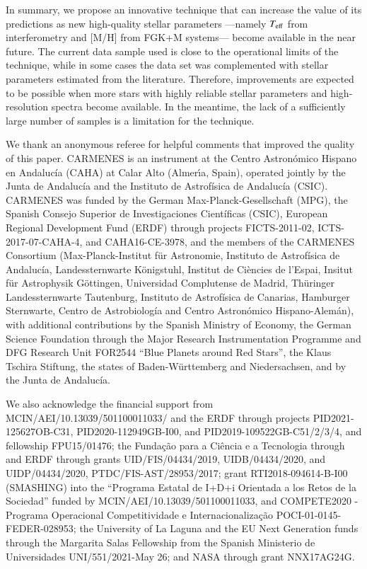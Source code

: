 \documentclass{aa}
\begin{document}
In summary, we propose an innovative technique that can increase the value of its predictions as new high-quality stellar parameters ---namely $T_{\rm eff}$ from interferometry and [M/H] from FGK+M systems--- become available in the near future. The current data sample used is close to the operational limits of the technique, while in some cases the data set was {complemented} with stellar parameters estimated from the literature. Therefore, improvements are expected to be possible when more stars with highly reliable stellar parameters and high-resolution spectra become available. In the meantime, the lack of a sufficiently large number of samples is a limitation for the technique. 



\begin{acknowledgements}
We thank an anonymous referee for helpful comments that improved the quality of this paper.
CARMENES is an instrument at the Centro Astron\'omico Hispano en Andaluc\'ia (CAHA) at Calar Alto (Almer\'{\i}a, Spain), operated jointly by the Junta de Andaluc\'ia and the Instituto de Astrof\'isica de Andaluc\'ia (CSIC).
CARMENES was funded by the German Max-Planck-Gesellschaft (MPG), the Spanish Consejo Superior de Investigaciones Cient\'ificas (CSIC), European Regional Development Fund (ERDF) through projects FICTS-2011-02, ICTS-2017-07-CAHA-4, and CAHA16-CE-3978, 
and the members of the CARMENES Consortium (Max-Planck-Institut f\"ur Astronomie, Instituto de Astrof\'isica de Andaluc\'ia, Landessternwarte K\"onigstuhl, Institut de Ci\`encies de l'Espai, Insitut f\"ur Astrophysik G\"ottingen, Universidad Complutense de Madrid, Th\"uringer Landessternwarte Tautenburg, Instituto de Astrof\'isica de Canarias, Hamburger Sternwarte, Centro de Astrobiolog\'ia and Centro Astron\'omico Hispano-Alem\'an), with additional contributions by the Spanish Ministry of Economy, the German Science Foundation through the Major Research Instrumentation Programme and DFG Research Unit FOR2544 ``Blue Planets around Red Stars'', the Klaus Tschira Stiftung, the states of Baden-W\"urttemberg and Niedersachsen, and by the Junta de Andaluc\'ia.

We also acknowledge the financial support from MCIN/AEI/10.13039/501100011033/ and the ERDF through projects 
PID2021-125627OB-C31, %
PID2020-112949GB-I00, %
and PID2019-109522GB-C51/2/3/4, %
and fellowship FPU15/01476; 
the Funda\c{c}\~{a}o para a Ci\^{e}ncia e a Tecnologia through and ERDF through grants UID/FIS/04434/2019, UIDB/04434/2020, and UIDP/04434/2020, PTDC/FIS-AST/28953/2017; 
grant RTI2018-094614-B-I00 (SMASHING) into the ``Programa Estatal de I+D+i Orientada a los Retos de la Sociedad'' funded by MCIN/AEI/10.13039/501100011033, and COMPETE2020 - Programa Operacional Competitividade e Internacionaliza\c{c}\~{a}o POCI-01-0145-FEDER-028953;
the University of La Laguna and the EU Next Generation funds through the Margarita Salas Fellowship from the Spanish Ministerio de Universidades UNI/551/2021-May 26;
and NASA through grant NNX17AG24G.

\end{acknowledgements}
\end{document}
